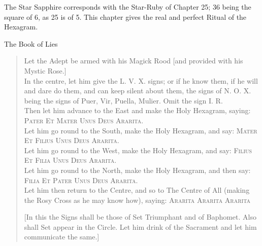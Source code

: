 

\epigraph{The Star Sapphire corresponds with the Star-Ruby of Chapter 25; 36 being the square of 6, as 25 is of 5. This chapter gives the real and perfect Ritual of the Hexagram.}{The Book of Lies}

\begin{verse}
Let the Adept be armed with his Magick Rood [and provided with his Mystic Rose.]\\
In the centre, let him give the L.\nolinebreak{} V.\nolinebreak{} X.\nolinebreak{} signs; or if he know them, if he will and dare do them, and can keep silent about them, the signs of N.\nolinebreak{} O.\nolinebreak{} X.\nolinebreak{} being the signs of Puer, Vir, Puella, Mulier. Omit the sign I.\nolinebreak{} R.\nolinebreak{}\\
Then let him advance to the East and make the Holy Hexagram, saying: \textsc{Pater Et Mater Unus Deus Ararita.}\\
Let him go round to the South, make the Holy Hexagram, and say: \textsc{Mater Et Filius Unus Deus Ararita.}\\
Let him go round to the West, make the Holy Hexagram, and say: \textsc{Filius Et Filia Unus Deus Ararita.}\\
Let him go round to the North, make the Holy Hexagram, and then say: \textsc{Filia Et Pater Unus Deus Ararita.}\\
Let him then return to the Centre, and so to The Centre of All (making the Rosy Cross as he may know how), saying: \textsc{Ararita Ararita Ararita}

[In this the Signs shall be those of Set Triumphant and of Baphomet. Also shall Set appear in the Circle. Let him drink of the Sacrament and let him communicate the same.]


\end{verse}
